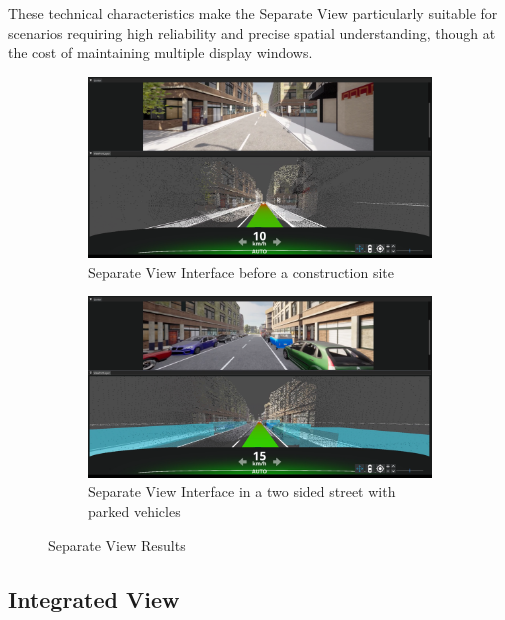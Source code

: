 These technical characteristics make the Separate View particularly suitable for scenarios requiring high reliability and precise spatial understanding, though at the cost of maintaining multiple display windows.
\begin{figure}[h]
    \centering
    \begin{subfigure}{0.8\textwidth}
        \includegraphics[width=\textwidth]{figures/result_sv.png}
        \centering
        \caption{Separate View Interface before a construction site}
        \label{fig:res_sv_1}
    \end{subfigure}
    \begin{subfigure}{0.8\textwidth}
        \includegraphics[width=\textwidth]{figures/results_2_sv.png}
        \centering
        \caption{Separate View Interface in a two sided street with parked vehicles}
        \label{fig:res_sv_2}
    \end{subfigure}
    \caption{Separate View Results}
    \label{fig:res_sv}
\end{figure}

\subsection*{Integrated View}

